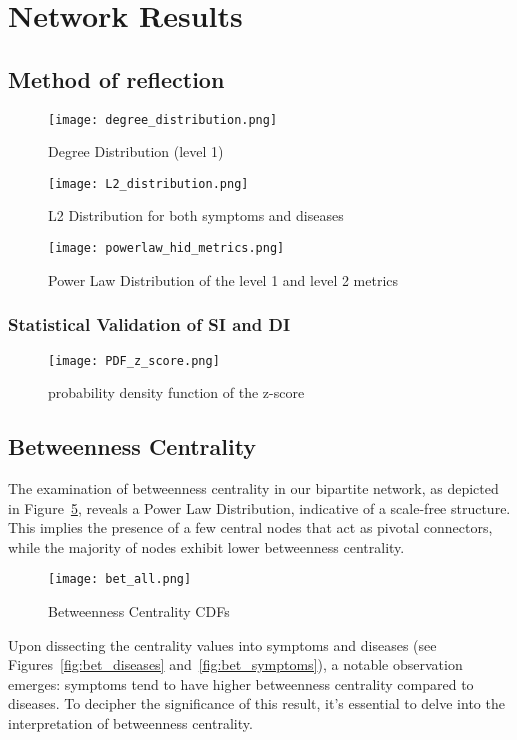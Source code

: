 \section{Network Results}
\subsection{Method of reflection}
\begin{figure}[H]
    \centering
    \texttt{[image: degree\_distribution.png]}
    \caption{Degree Distribution (level 1)}
    \label{fig:DegreeDistribution}
\end{figure}

\begin{figure}[H]
    \centering
    \texttt{[image: L2\_distribution.png]}
    \caption{L2 Distribution for both symptoms and diseases}
    \label{fig:l2_distribution}
\end{figure}

\begin{figure}[H]
    \centering
    \texttt{[image: powerlaw\_hid\_metrics.png]}
    \caption{Power Law Distribution of the level 1 and level 2 metrics}
    \label{fig:powerlaw_hid_metrics}
\end{figure}
\subsubsection*{Statistical Validation of SI and DI}
\begin{figure}[H]
    \centering
    \texttt{[image: PDF\_z\_score.png]}
    \caption{probability density function of the z-score}
    \label{fig:pdf_z_score}
\end{figure}

\subsection{Betweenness Centrality}
The examination of betweenness centrality in our bipartite network, as depicted in Figure~\ref{fig:bet_all},
reveals a Power Law Distribution, indicative of a scale-free structure. This implies the presence of a few central
nodes that act as pivotal connectors, while the majority of nodes exhibit lower betweenness centrality.

\begin{figure}[H]
    \centering
    \texttt{[image: bet\_all.png]}
    \caption{Betweenness Centrality CDFs}
    \label{fig:bet_all}
\end{figure}
\noindent
Upon dissecting the centrality values into symptoms and diseases (see Figures~\ref{fig:bet_diseases} and~\ref{fig:bet_symptoms}),
a notable observation emerges: symptoms tend to have higher betweenness centrality compared to diseases. To decipher the
significance of this result, it's essential to delve into the interpretation of betweenness centrality.

